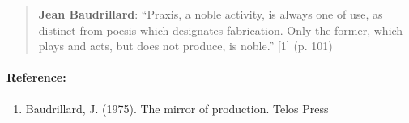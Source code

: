 \begin{quote}
\textbf{Jean Baudrillard}: ``Praxis, a noble activity, is always one of
use, as distinct from poesis which designates fabrication. Only the
former, which plays and acts, but does not produce, is noble.'' {[}1{]}
(p. 101)
\end{quote}

\paragraph{Reference:}

\begin{enumerate}
\itemsep1pt\parskip0pt
\item
  Baudrillard, J. (1975). The mirror of production. Telos Press
\end{enumerate}

~
